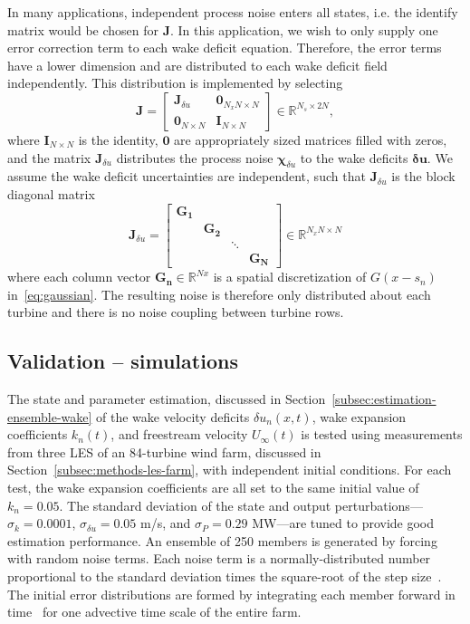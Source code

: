 In many applications, independent process noise enters all states, i.e. the identify matrix would be chosen for $\mathbf{J}$. In this application, we wish to only supply one error correction term to each wake deficit equation. Therefore, the error terms have a lower dimension and are distributed to each wake deficit field independently. This distribution is implemented by selecting
\begin{equation}
\mathbf{J} = 
\begin{bmatrix}
\mathbf{J}_{\delta u} & \mathbf{0}_{N_x N\times N}\\
 \mathbf{0}_{N\times N} & \mathbf{I}_{N \times N}
\end{bmatrix}\in \mathbb{R}^{N_s \times 2N},
\end{equation}
where $\mathbf{I}_{N \times N}$ is the identity, $\mathbf{0}$ are appropriately sized matrices filled with zeros, and the matrix $\mathbf{J}_{\delta u}$ distributes the process noise $\boldsymbol \chi_{\delta u}$ to the wake deficits $\boldsymbol \delta \mathbf{u}$. We assume the wake deficit uncertainties are independent, such that $\mathbf{J}_{\delta u}$ is the block diagonal matrix
\begin{equation}
\mathbf{J}_{\delta u} = 
\begin{bmatrix}
\mathbf{G_1} 	& 			 &			&				\\
			& \mathbf{G_2} & 			&				\\
			&			& \ddots 		&				\\
			&			&			& \mathbf{G_N}	
\end{bmatrix}\in \mathbb{R}^{N_x N \times N}
\end{equation}
where each column vector $\mathbf{G_n} \in \mathbb{R}^{Nx}$ is a spatial discretization of $G(x-s_n)$ in~\eqref{eq:gaussian}. The resulting noise is therefore only distributed about each turbine and there is no noise coupling between turbine rows.

\subsection{Validation -- simulations}
\label{subsec:estimation-ensemble-validation}
The state and parameter estimation, discussed in Section~\ref{subsec:estimation-ensemble-wake} of the wake velocity deficits $\delta u_n(x,t)$, wake expansion coefficients $k_n(t)$, and freestream velocity $U_\infty(t)$ is tested using measurements from three LES of an 84-turbine wind farm, discussed in Section~\ref{subsec:methods-les-farm}, with independent initial conditions. For each test, the wake expansion coefficients are all set to the same initial value of $k_n = 0.05$. The standard deviation of the state and output perturbations---$\sigma_k = 0.0001$, $\sigma_{\delta u} = 0.05$ m/s, and $\sigma_P = 0.29$ MW---are tuned to provide good estimation performance. An ensemble of 250 members is generated by forcing with random noise terms. Each noise term is a normally-distributed number proportional to the standard deviation times the square-root of the step size~\cite{Evensen2003a}. The initial error distributions are formed by integrating each member forward in time~\cite{Evensen2003a} for one advective time scale of the entire farm.

